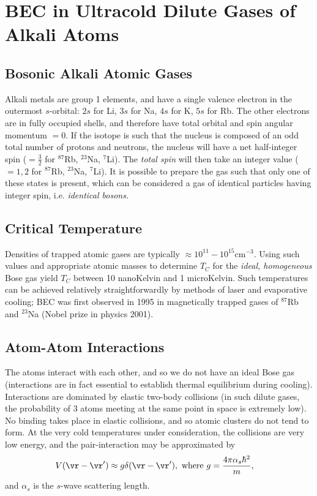 \documentclass[a4paper, 11pt, normalem]{report}
\begin{document}
\chapter{BEC in Ultracold Dilute Gases of Alkali Atoms}
\section{Bosonic Alkali Atomic Gases}
Alkali metals are group 1 elements, and have a single valence electron in the outermost $s$-orbital: $2s$ for Li, $3s$ for Na, $4s$ for K, $5s$ for Rb.
The other electrons are in fully occupied shells, and therefore have total orbital and spin angular momentum $=0$.
If the isotope is such that the nucleus is composed of an odd total number of protons and neutrons, the nucleus will have a net half-integer spin ($=\frac32$ for $^{87}$Rb, $^{23}$Na, $^7$Li).
The \emph{total spin} will then take an integer value ($=1,2$ for $^{87}$Rb, $^{23}$Na, $^7$Li).
It is possible to prepare the gas such that only one of these states is present, which can be considered a gas of identical particles having integer spin, i.e. \emph{identical bosons.}

\section{Critical Temperature}
Densities of trapped atomic gases are typically $\approx10^{11}-10^{15}$cm$^{-3}$.
Using such values and appropriate atomic masses to determine $T_C$ for the \emph{ideal, homogeneous} Bose gas yield $T_C$ between 10 nanoKelvin and 1 microKelvin.
Such temperatures can be achieved relatively straightforwardly by methods of laser and evaporative cooling; BEC was first observed in 1995 in magnetically trapped gases of $^{87}$Rb and $^{23}$Na (Nobel prize in physics 2001).

\section{Atom-Atom Interactions}
The atoms interact with each other, and so we do not have an ideal Bose gas (interactions are in fact essential to establish thermal equilibrium during cooling).
Interactions are dominated by elastic two-body collisions (in such dilute gases, the probability of 3 atoms meeting at the same point in space is extremely low).
No binding takes place in elastic collisions, and so atomic clusters do not tend to form.
At the very cold temperatures under consideration, the collisions are very low energy, and the pair-interaction may be approximated by
\begin{align}
    V(\vr-\vr') &\approx g\delta(\vr-\vr'), \text{ where } g = \frac{4\pi\alpha_s\hbar^2}{m},
\end{align}
and $\alpha_s$ is the $s$-wave scattering length.
\end{document}

